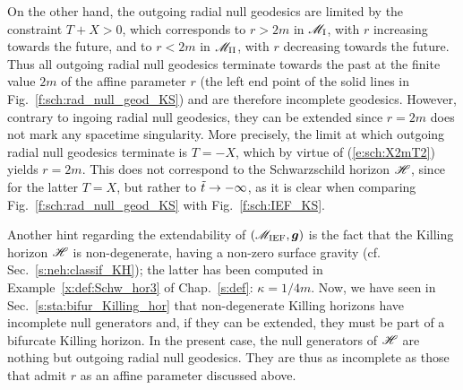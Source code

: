 On the other hand, the outgoing radial null geodesics are limited by
the constraint $T+X > 0$, which corresponds to $r>2m$ in $\mathscr{M}_{\rm I}$, with $r$ increasing towards
the future, and to
$r<2m$ in $\mathscr{M}_{\rm II}$, with $r$ decreasing towards the future.
Thus all outgoing radial null geodesics terminate towards the past at the finite
value $2m$ of the affine parameter $r$
(the left end point of the solid lines in Fig.~\ref{f:sch:rad_null_geod_KS}) and are therefore incomplete geodesics.
However, contrary to ingoing radial null geodesics, they can be extended
since $r=2m$ does not mark any spacetime singularity.
More precisely, the limit at which outgoing radial null geodesics
terminate is $T=-X$, which by virtue of (\ref{e:sch:X2mT2}) yields $r=2m$.
This does not correspond to the Schwarzschild horizon $\mathscr{H}$, since for
the latter $T=X$, but rather to ${\tilde t}\rightarrow-\infty$,
as it is clear when comparing Fig.~\ref{f:sch:rad_null_geod_KS}
with Fig.~\ref{f:sch:IEF_KS}.

Another hint regarding the extendability of $(\mathscr{M}_{\rm IEF}, \bm{g})$
is the fact that the Killing horizon $\mathscr{H}$ is non-degenerate, having
a non-zero surface gravity (cf. Sec.~\ref{s:neh:classif_KH}); the latter
has been computed in Example~\ref{x:def:Schw_hor3} of Chap.~\ref{s:def}:
$\kappa = 1/4m$. Now, we have seen in Sec.~\ref{s:sta:bifur_Killing_hor}
that non-degenerate Killing horizons have incomplete null generators
and, if they can be extended, they must be part of a
bifurcate Killing horizon. In the present case, the null generators of $\mathscr{H}$
are nothing but outgoing radial null geodesics. They are thus as incomplete
as those that admit $r$ as an affine parameter discussed above.

